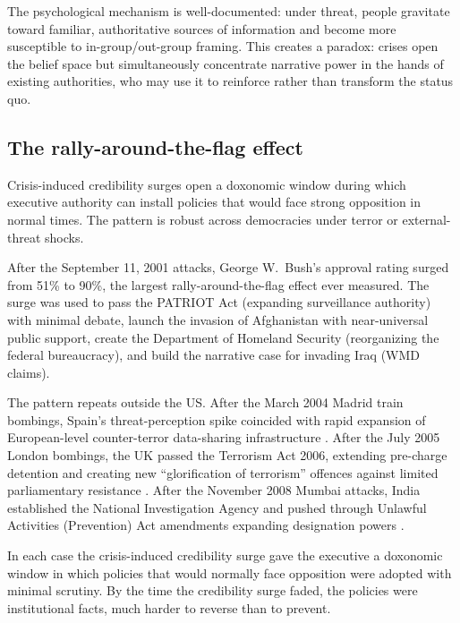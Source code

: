 The psychological mechanism is well-documented: under threat, people gravitate toward familiar, authoritative sources of information and become more susceptible to in-group/out-group framing.
This creates a paradox: crises open the belief space but simultaneously concentrate narrative power in the hands of existing authorities, who may use it to reinforce rather than transform the status quo.

\subsection{The rally-around-the-flag effect}

\begin{example}
\label{ex:rally-flag}
Crisis-induced credibility surges open a doxonomic window during which executive authority can install policies that would face strong opposition in normal times.
The pattern is robust across democracies under terror or external-threat shocks.

After the September 11, 2001 attacks, George W.\ Bush's approval rating surged from 51\% to 90\%, the largest rally-around-the-flag effect ever measured.
The surge was used to pass the PATRIOT Act (expanding surveillance authority) with minimal debate, launch the invasion of Afghanistan with near-universal public support, create the Department of Homeland Security (reorganizing the federal bureaucracy), and build the narrative case for invading Iraq (WMD claims).

The pattern repeats outside the US.
After the March 2004 Madrid train bombings, Spain's threat-perception spike coincided with rapid expansion of European-level counter-terror data-sharing infrastructure \autocite{argomaniz2009}.
After the July 2005 London bombings, the UK passed the Terrorism Act 2006, extending pre-charge detention and creating new ``glorification of terrorism'' offences against limited parliamentary resistance \autocite{walker2011}.
After the November 2008 Mumbai attacks, India established the National Investigation Agency and pushed through Unlawful Activities (Prevention) Act amendments expanding designation powers \autocite{kalhan2010}.

In each case the crisis-induced credibility surge gave the executive a doxonomic window in which policies that would normally face opposition were adopted with minimal scrutiny.
By the time the credibility surge faded, the policies were institutional facts, much harder to reverse than to prevent.
\end{example}

